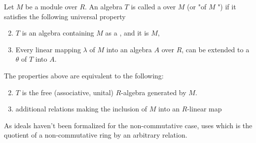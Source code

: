 \begin{definition}
    \label{TensorAlgebra}

    Let $M$ be a module over $R$. An algebra $T$ is called a  over $M$ (or "of $M$ ")
    if it satisfies the following universal property

    \begin{enumerate}
    \setcounter{enumi}{1}
    \item $T$ is an algebra containing $M$ as a , and it is  $M$,
    \item Every linear mapping $\lambda$ of $M$ into an algebra $A$ over $R$, can be extended to 
    a  $\theta$ of $T$ into $A$.
    \end{enumerate}

\end{definition}

\begin{remark}
    \label{mk:TensorAlgebra}

    The properties above are equivalent to the following:

    \begin{enumerate}
        \setcounter{enumi}{1}
        \item $T$ is the free (associative, unital) $R$-algebra generated by $M$.
        \item additional relations making the inclusion of $M$ into an $R$-linear map
    \end{enumerate}

    As ideals haven't been formalized for the non-commutative case, \Mathlib uses  which is
    the quotient of a non-commutative ring by an arbitrary relation.
    
\end{remark}